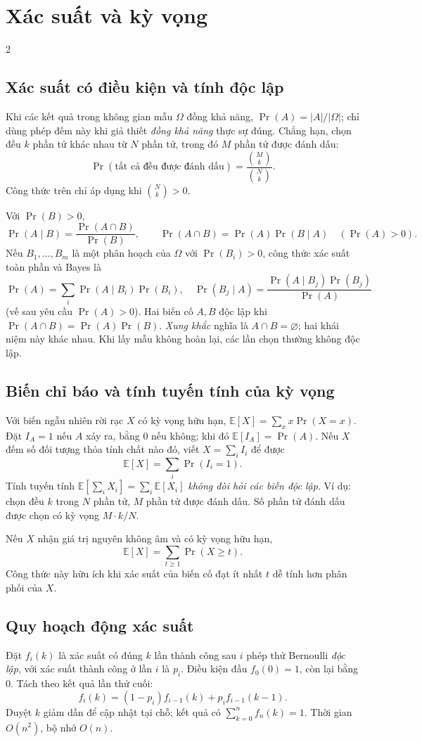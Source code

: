 \section{Xác suất và kỳ vọng}
\begingroup\small
\begin{multicols}{2}

\subsection{Xác suất có điều kiện và tính độc lập}
Khi các kết quả trong không gian mẫu $\Omega$ đồng khả năng,
$\Pr(A)=|A|/|\Omega|$; chỉ dùng phép đếm này khi giả thiết
\emph{đồng khả năng} thực sự đúng. Chẳng hạn, chọn đều $k$ phần tử
khác nhau từ $N$ phần tử, trong đó $M$ phần tử được đánh dấu:
\[
\Pr(\text{tất cả đều được đánh dấu})
=\frac{\binom Mk}{\binom Nk}.
\]
Công thức trên chỉ áp dụng khi $\binom Nk>0$.

Với $\Pr(B)>0$,
\[
\Pr(A\mid B)=\frac{\Pr(A\cap B)}{\Pr(B)},\qquad
\Pr(A\cap B)=\Pr(A)\Pr(B\mid A)\quad(\Pr(A)>0).
\]
Nếu $B_1,\ldots,B_m$ là một phân hoạch của $\Omega$ với
$\Pr(B_i)>0$, công thức xác suất toàn phần và Bayes là
\[
\Pr(A)=\sum_i\Pr(A\mid B_i)\Pr(B_i),\quad
\Pr(B_j\mid A)=
\frac{\Pr(A\mid B_j)\Pr(B_j)}{\Pr(A)}
\]
(vế sau yêu cầu $\Pr(A)>0$).
Hai biến cố $A,B$ độc lập khi
$\Pr(A\cap B)=\Pr(A)\Pr(B)$.
\emph{Xung khắc} nghĩa là $A\cap B=\varnothing$; hai khái niệm
này khác nhau. Khi lấy mẫu không hoàn lại, các lần chọn thường
không độc lập.

\subsection{Biến chỉ báo và tính tuyến tính của kỳ vọng}
Với biến ngẫu nhiên rời rạc $X$ có kỳ vọng hữu hạn,
$\mathbb E[X]=\sum_x x\Pr(X=x)$. Đặt $I_A=1$ nếu $A$ xảy ra,
bằng $0$ nếu không; khi đó $\mathbb E[I_A]=\Pr(A)$.
Nếu $X$ đếm số đối tượng thỏa tính chất nào đó, viết
$X=\sum_i I_i$ để được
\[
\mathbb E[X]=\sum_i\Pr(I_i=1).
\]
Tính tuyến tính $\mathbb E[\sum_iX_i]=\sum_i\mathbb E[X_i]$
\emph{không đòi hỏi các biến độc lập}. Ví dụ: chọn đều $k$ trong
$N$ phần tử, $M$ phần tử được đánh dấu. Số phần tử đánh dấu được
chọn có kỳ vọng $M\cdot k/N$.

Nếu $X$ nhận giá trị nguyên không âm và có kỳ vọng hữu hạn,
\[
\mathbb E[X]=\sum_{t\ge1}\Pr(X\ge t).
\]
Công thức này hữu ích khi xác suất của biến cố đạt ít nhất
$t$ dễ tính hơn phân phối của $X$.

\subsection{Quy hoạch động xác suất}
Đặt $f_i(k)$ là xác suất có đúng $k$ lần thành công sau $i$
phép thử Bernoulli \emph{độc lập}, với xác suất thành công ở lần
$i$ là $p_i$. Điều kiện đầu $f_0(0)=1$, còn lại bằng $0$.
Tách theo kết quả lần thử cuối:
\[
f_i(k)=(1-p_i)f_{i-1}(k)+p_i f_{i-1}(k-1).
\]
Duyệt $k$ giảm dần để cập nhật tại chỗ; kết quả có
$\sum_{k=0}^n f_n(k)=1$. Thời gian $O(n^2)$, bộ nhớ $O(n)$.


\end{multicols}
